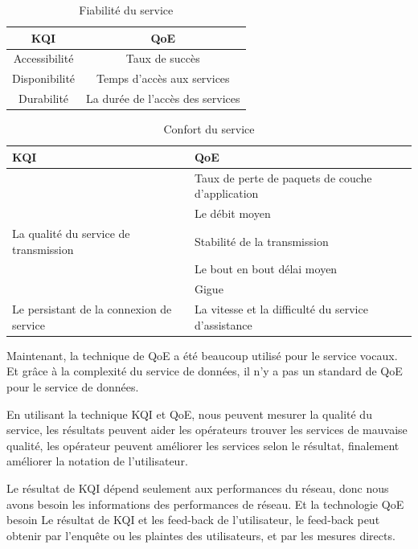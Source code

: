 \begin{table}[H]
	\centering
	\caption{Fiabilité du service }
	\label{table.fiabilité}
\begin{tabular}{|c|c|}
\hline \rule[-2ex]{0pt}{5.5ex} KQI & QoE \\ 
\hline \rule[-2ex]{0pt}{5.5ex} Accessibilité & Taux de succès  \\ 
\hline \rule[-2ex]{0pt}{5.5ex} Disponibilité  & Temps d'accès aux services \\ 
\hline \rule[-2ex]{0pt}{5.5ex} Durabilité & La durée de l'accès des services \\ 
\hline 
\end{tabular} 
\end{table}

\begin{table}[H]
	\centering
	\caption{Confort du service}
	\label{table.confort}
\begin{tabular}{|>{\centering\arraybackslash}p{5 cm}|>{\centering\arraybackslash}p{6 cm}|}
\hline KQI & QoE \\ 
\hline  & Taux de perte de paquets de couche d'application \\ 
\hline  & Le débit moyen  \newline \\ 
\hline La qualité du service de transmission & Stabilité de la transmission \\ 
\hline & Le bout en bout délai moyen \newline  \\ 
\hline & Gigue \newline  \\ 
\hline Le persistant de la connexion de service & La vitesse et la difficulté du service d'assistance\\ 
\hline 
\end{tabular} 
\end{table}

Maintenant, la technique de QoE a été beaucoup utilisé pour le service vocaux. Et grâce à la complexité du service de données, il n'y a pas un standard de QoE pour le service de données. 

En utilisant la technique KQI et QoE, nous peuvent mesurer la qualité du service, les résultats peuvent aider les opérateurs trouver les services de mauvaise qualité, les opérateur peuvent améliorer les services selon le résultat, finalement améliorer la notation de l'utilisateur.  

Le résultat de KQI dépend seulement aux performances du réseau, donc nous avons besoin les informations des performances de réseau. Et la technologie QoE besoin Le résultat de KQI et les feed-back de l'utilisateur, le feed-back peut obtenir par l'enquête ou les plaintes des utilisateurs,  et par les mesures directs.

